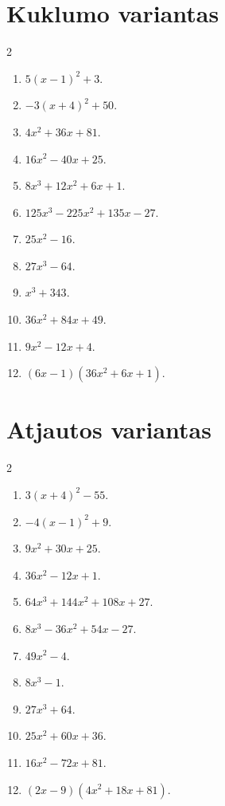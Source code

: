 \documentclass[11pt,a4paper]{article}
\newcommand{\variantas}[2]{%
  \section*{#1 variantas}
  \begin{multicols}{2}
    \begin{enumerate}
      #2
    \end{enumerate}
  \end{multicols}
}
\begin{document}
\newpage
\variantas{Kuklumo}{
\item \(5(x-1)^2+3\).
\item \(-3(x+4)^2+50\).
\item \(4x^2+36x+81\).
\item \(16x^2-40x+25\).
\item \(8x^3+12x^2+6x+1\).
\item \(125x^3-225x^2+135x-27\).
\item \(25x^2-16\).
\item \(27x^3-64\).
\item \(x^3+343\).
\item \(36x^2+84x+49\).
\item \(9x^2-12x+4\).
\item \((6x-1)(36x^2+6x+1)\).
}
\variantas{Atjautos}{
\item \(3(x+4)^2-55\).
\item \(-4(x-1)^2+9\).
\item \(9x^2+30x+25\).
\item \(36x^2-12x+1\).
\item \(64x^3+144x^2+108x+27\).
\item \(8x^3-36x^2+54x-27\).
\item \(49x^2-4\).
\item \(8x^3-1\).
\item \(27x^3+64\).
\item \(25x^2+60x+36\).
\item \(16x^2-72x+81\).
\item \((2x-9)(4x^2+18x+81)\).
}
\end{document}
